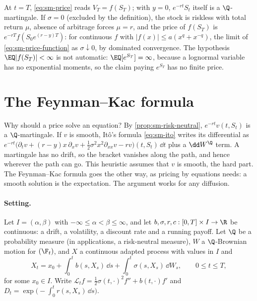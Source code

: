 \begin{remark}\label{rem:sm-edges}
At $t=T$, \eqref{eq:sm-price} reads $V_T=f(S_T)$; with $y=0$, $e^{-rt}S_t$ itself is a
$\Q$-martingale. If $\sigma=0$ (excluded by the definition), the stock is riskless with total
return $\mu$, absence of arbitrage forces $\mu=r$, and the price of $f(S_T)$ is
$e^{-rT}f(S_0e^{(r-y)T})$: for continuous $f$ with $|f(x)|\le a(x^q+x^{-q})$, the limit of
\eqref{eq:sm-price-function} as $\sigma\downarrow0$, by dominated convergence. The hypothesis
$\EQ|f(S_T)|<\infty$ is not automatic: $\EQ[e^{S_T}]=\infty$, because a lognormal variable has no
exponential moments, so the claim paying $e^{S_T}$ has no finite price.
\end{remark}


\section{The Feynman--Kac formula}\label{sec:sm-feynman-kac}

Why should a price solve an equation? By \cref{prop:sm-risk-neutral}, $e^{-rt}v(t,S_t)$ is a
$\Q$-martingale. If $v$ is smooth, It\^o's formula \eqref{eq:sm-ito} writes its differential as
$e^{-rt}\big(\partial_tv+(r-y)x\,\partial_xv+\frac12\sigma^2x^2\partial_{xx}v-rv\big)(t,S_t)\,\dd t$
plus a $\dd W^\Q$ term. A martingale has no drift, so the bracket vanishes along the path, and
hence wherever the path can go. This heuristic assumes that $v$ is smooth, the hard part. The
Feynman--Kac formula goes the other way, as pricing by equations needs: a smooth solution is the
expectation. The argument works for any diffusion.

\paragraph{Setting.} Let $I=(\alpha,\beta)$ with $-\infty\le\alpha<\beta\le\infty$, and let
$b,\sigma,r,c:[0,T]\times I\to\R$ be continuous: a drift, a volatility, a discount rate and a
running payoff. Let $\Q$ be a probability measure (in applications, a risk-neutral measure), $W$
a $\Q$-Brownian motion for $(\F_t)$, and $X$ a continuous adapted process with values in $I$ and
\[
  X_t=x_0+\int_0^tb(s,X_s)\,\dd s+\int_0^t\sigma(s,X_s)\,\dd W_s,\qquad 0\le t\le T,
\]
for some $x_0\in I$. Write $\mathcal L_tf=\frac12\sigma(t,\cdot)^2f''+b(t,\cdot)f'$ and
$D_t=\exp\big(-\int_0^tr(s,X_s)\,\dd s\big)$.

